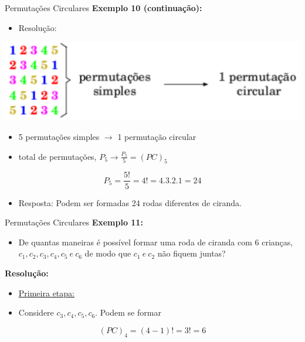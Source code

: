 \documentclass[aspectratio=169]{beamer}
\begin{document}
\begin{frame}{Permutações Circulares}
    \textbf{Exemplo 10 (continuação):}

    \vspace{2mm}

    \begin{itemize}
        \item[] Resolução:
    \end{itemize}

    \begin{center}
        \includegraphics[width=0.5\linewidth]{figs/Exemplo10_1.png}
    \end{center}

    \begin{itemize}
        \item 5 permutações simples $\longrightarrow$ 1 permutação circular \pause
        \item total de permutações, $P_5 \longrightarrow \frac{P_5}{5} = (PC)_5$
    \end{itemize}

    \pause
    $$P_5 = \frac{5!}{5} = 4! = 4 . 3 . 2 . 1 = 24$$

    \pause
    \begin{itemize}
        \item Resposta: Podem ser formadas 24 rodas diferentes de ciranda.
    \end{itemize}

\end{frame}


\begin{frame}{Permutações Circulares}
    \textbf{Exemplo 11:}

    \vspace{2mm}

    \begin{itemize}
        \item[] De quantas maneiras é possível formar uma roda de ciranda com 6 crianças, $c_1, c_2, c_3, c_4, c_5 ~ e ~ c_6$ de modo que $c_1  ~ e ~ c_2$ não fiquem juntas?
    \end{itemize}

    \pause

    \textbf{Resolução:}

    \begin{itemize}
        \item[] \underline{Primeira etapa:}
        \item[] Considere $c_3, c_4, c_5, c_6$. Podem se formar
    \end{itemize}

    $$(PC)_4 = (4-1)! = 3! = 6$$

\end{frame}
\end{document}
